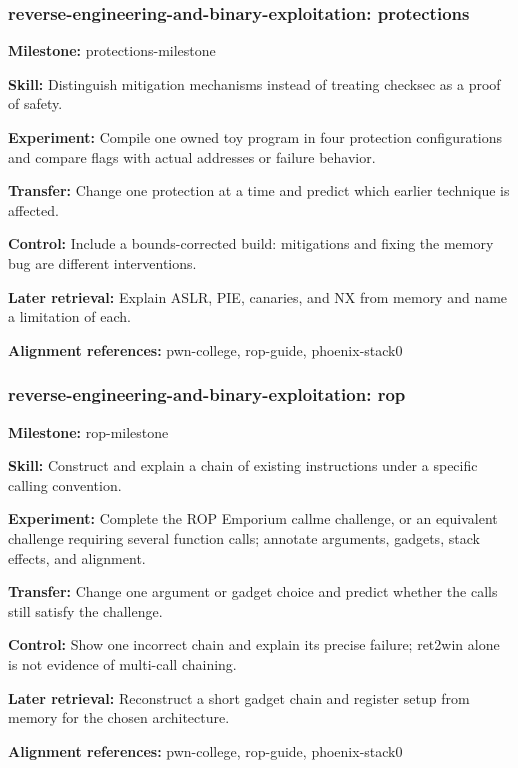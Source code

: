 \subsubsection{reverse-engineering-and-binary-exploitation: protections}
\noindent\textbf{Milestone:} protections-milestone\par
\noindent\textbf{Skill:} Distinguish mitigation mechanisms instead of treating checksec as a proof of safety.\par
\noindent\textbf{Experiment:} Compile one owned toy program in four protection configurations and compare flags with actual addresses or failure behavior.\par
\noindent\textbf{Transfer:} Change one protection at a time and predict which earlier technique is affected.\par
\noindent\textbf{Control:} Include a bounds-corrected build: mitigations and fixing the memory bug are different interventions.\par
\noindent\textbf{Later retrieval:} Explain ASLR, PIE, canaries, and NX from memory and name a limitation of each.\par
\noindent\textbf{Alignment references:} pwn-college, rop-guide, phoenix-stack0\par
\subsubsection{reverse-engineering-and-binary-exploitation: rop}
\noindent\textbf{Milestone:} rop-milestone\par
\noindent\textbf{Skill:} Construct and explain a chain of existing instructions under a specific calling convention.\par
\noindent\textbf{Experiment:} Complete the ROP Emporium callme challenge, or an equivalent challenge requiring several function calls; annotate arguments, gadgets, stack effects, and alignment.\par
\noindent\textbf{Transfer:} Change one argument or gadget choice and predict whether the calls still satisfy the challenge.\par
\noindent\textbf{Control:} Show one incorrect chain and explain its precise failure; ret2win alone is not evidence of multi-call chaining.\par
\noindent\textbf{Later retrieval:} Reconstruct a short gadget chain and register setup from memory for the chosen architecture.\par
\noindent\textbf{Alignment references:} pwn-college, rop-guide, phoenix-stack0\par
